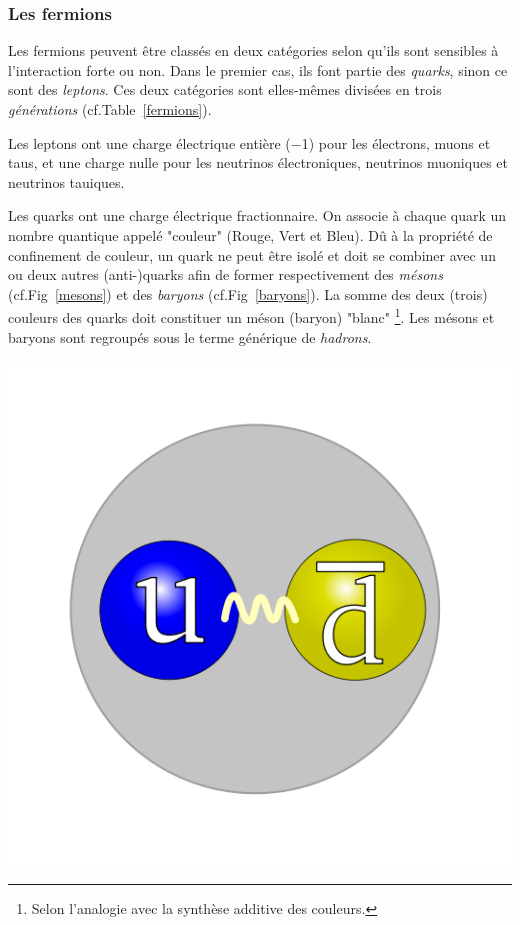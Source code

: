 \subsubsection{Les fermions}
Les fermions peuvent être classés en deux catégories selon qu'ils sont sensibles à l'interaction forte ou non. Dans le premier cas, ils font partie des \textit{quarks}, sinon ce sont des \textit{leptons}. Ces deux catégories sont elles-mêmes divisées en trois \textit{générations} (cf.Table~\ref{fermions}).

Les leptons ont une charge électrique entière (\num{-1}) pour les électrons, muons et taus, et une charge nulle pour les neutrinos électroniques, neutrinos muoniques et neutrinos tauiques.

Les quarks ont une charge électrique fractionnaire. On associe à chaque quark un nombre quantique appelé "couleur" (Rouge, Vert et Bleu). Dû à la propriété de confinement de couleur, un quark ne peut être isolé et doit se combiner avec un ou deux autres (anti-)quarks afin de former respectivement des \textit{mésons} (cf.Fig~\ref{mesons}) et des \textit{baryons} (cf.Fig~\ref{baryons}). La somme des deux (trois) couleurs des quarks doit constituer un méson (baryon) "blanc" \footnote{Selon l'analogie avec la synthèse additive des couleurs.}. Les mésons et baryons sont regroupés sous le terme générique de \textit{hadrons}.

\marginpar
{
	\centering
	\includegraphics[width=\marginparwidth]{SM/quarks2.png}
	\label{mesons}
}

